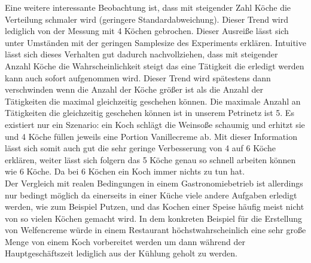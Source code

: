 Eine weitere interessante Beobachtung ist, dass mit steigender Zahl Köche die Verteilung schmaler wird (geringere Standardabweichung). Dieser Trend wird lediglich von der Messung mit 4 Köchen gebrochen. Dieser Ausreiße lässt sich unter Umständen mit der geringen Samplesize des Experiments erklären. Intuitive lässt sich dieses Verhalten gut dadurch nachvollziehen, dass mit steigender Anzahl Köche die Wahrscheinlichkeit steigt das eine Tätigkeit die erledigt werden kann auch sofort aufgenommen wird. Dieser Trend wird spätestens dann verschwinden wenn die Anzahl der Köche größer ist als die Anzahl der Tätigkeiten die maximal gleichzeitig geschehen können. Die maximale Anzahl an Tätigkeiten die gleichzeitig geschehen können ist in unserem Petrinetz ist 5. Es existiert nur ein Szenario: ein Koch schlägt die Weinsoße schaumig und erhitzt sie und 4 Köche füllen jeweils eine Portion Vanillecreme ab. Mit dieser Information lässt sich somit auch gut die sehr geringe Verbesserung von 4 auf 6 Köche erklären, weiter lässt sich folgern das 5 Köche genau so schnell arbeiten können wie 6 Köche. Da bei 6 Köchen ein Koch immer nichts zu tun hat.\\

Der Vergleich mit realen Bedingungen in einem Gastronomiebetrieb ist allerdings nur bedingt möglich da einerseits in einer Küche viele andere Aufgaben erledigt werden, wie zum Beispiel Putzen, und das Kochen einer Speise häufig meist nicht von so vielen Köchen gemacht wird. In dem konkreten Beispiel für die Erstellung von Welfencreme würde in einem Restaurant höchstwahrscheinlich eine sehr große Menge von einem Koch vorbereitet werden um dann während der Hauptgeschäftszeit lediglich aus der Kühlung geholt zu werden.





